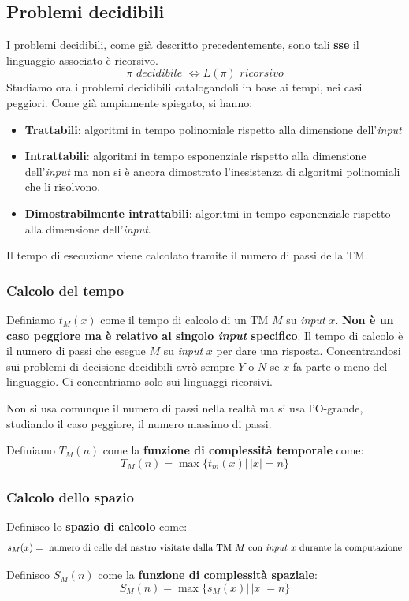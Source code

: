 \subsection{Problemi decidibili}
I problemi decidibili, come già descritto precedentemente, sono tali \textbf{sse} il linguaggio associato è ricorsivo.
\[\pi \,\,decidibile\,\, \iff L(\pi)\,\,ricorsivo\]
Studiamo ora i problemi decidibili catalogandoli in base ai tempi, nei casi
peggiori. Come già ampiamente spiegato, si hanno: 
\begin{itemize}
  \item \textbf{Trattabili}: algoritmi in tempo polinomiale rispetto alla dimensione dell'\textit{input}
    \item \textbf{Intrattabili}: algoritmi in tempo esponenziale rispetto alla dimensione dell'\textit{input} ma non si è ancora dimostrato l'inesistenza di algoritmi polinomiali che li risolvono.
  \item \textbf{Dimostrabilmente intrattabili}: algoritmi in tempo esponenziale rispetto alla dimensione dell'\textit{input}.
\end{itemize}
Il tempo di esecuzione viene calcolato tramite il numero di passi della TM.
\subsubsection{Calcolo del tempo}
\begin{definizione}
  Definiamo $t_M(x)$ come il tempo di calcolo di un TM $M$ su \textit{input} $x$. \textbf{Non è
  un caso peggiore ma è relativo al singolo \textit{input} specifico}. Il tempo di
  calcolo è il numero di passi che esegue $M$ su \textit{input} $x$ per dare una
  risposta. Concentrandosi sui problemi di decisione decidibili avrò sempre $Y$
  o $N$ se $x$ fa parte o meno del linguaggio. Ci concentriamo solo sui
  linguaggi ricorsivi.
\end{definizione}
Non si usa comunque il numero di passi nella realtà ma si usa l'O-grande,
studiando il caso peggiore, il numero massimo di passi.
\begin{definizione}
  Definiamo $T_M(n)$ come la \textbf{funzione di complessità temporale} come:
  \[T_M(n)=\max\{t_m(x)|\,|x|=n\}\]
\end{definizione}
\subsubsection{Calcolo dello spazio}
\begin{definizione}
  Definisco lo \textbf{spazio di calcolo} come:
  \[s_M(x)=\mbox{ numero di celle del nastro visitate dalla TM $M$ con \textit{input} $x$ durante la computazione}\]
\end{definizione}
\begin{definizione}
  Definisco $S_M(n)$ come la \textbf{funzione di complessità spaziale}:
  \[S_M(n)=\max\{s_M(x)|\,|x|=n\}\]
\end{definizione}
